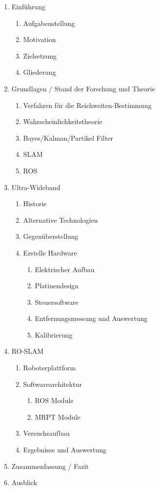 \documentclass[12pt]{article}
\begin{document}
\begin{enumerate}
	\item Einführung
	\begin{enumerate}
		\item Aufgabenstellung			%
		\item Motivation					%
		\item Zielsetzung					%
		\item Gliederung					%
	\end{enumerate}
	\item Grundlagen / Stand der Forschung und Theorie
	\begin{enumerate}
		\item Verfahren für die Reichweiten-Bestimmung
		\item Wahrscheinlichkeitstheorie
		\item Bayes/Kalman/Partikel Filter
		\item SLAM
		\item ROS								%
	\end{enumerate}
	\item Ultra-Wideband
	\begin{enumerate}
		\item Historie
		\item Alternative Technologien
		\item Gegenüberstellung
		\item Erstelle Hardware
		\begin{enumerate}
			\item Elektrischer Aufbau
			\item Platinendesign
			\item Steuersoftware
			\item Entfernungsmessung und Auswertung		%
			\item Kalibrierung
		\end{enumerate}
	\end{enumerate}
	\item RO-SLAM
	\begin{enumerate}
		\item Roboterplattform				%
		\item Softwarearchitektur		%
		\begin{enumerate}	
			\item ROS Module
			\item MRPT Module
		\end{enumerate}
		\item Versuchsaufbau				%
		\item Ergebnisse und Auswertung
	\end{enumerate}
\item Zusammenfassung / Fazit
\item Ausblick
\end{enumerate}
\end{document}
